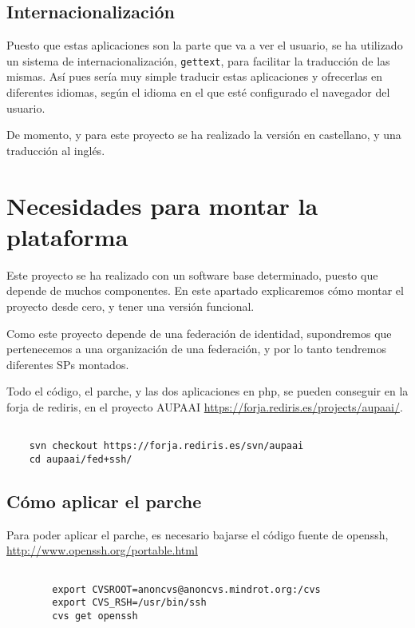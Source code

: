     \subsection{Internacionalización}

    Puesto que estas aplicaciones son la parte que va a ver el
    usuario, se ha utilizado un sistema de internacionalización,
    \texttt{gettext}, para facilitar la traducción de las mismas. Así
    pues sería muy simple traducir estas aplicaciones y ofrecerlas en
    diferentes idiomas, según el idioma en el que esté configurado el
    navegador del usuario.

    De momento, y para este proyecto se ha realizado la versión en
    castellano, y una traducción al inglés.

    \section{Necesidades para montar la plataforma}

    Este proyecto se ha realizado con un software base determinado,
    puesto que depende de muchos componentes. En este apartado
    explicaremos cómo montar el proyecto desde cero, y tener una
    versión funcional.

    Como este proyecto depende de una federación de identidad,
    supondremos que pertenecemos a una organización de una federación,
    y por lo tanto tendremos diferentes SPs montados.

    Todo el código, el parche, y las dos aplicaciones en php, se
    pueden conseguir en la forja de rediris, en el proyecto AUPAAI 
    \url{https://forja.rediris.es/projects/aupaai/}.

    \begin{verbatim}

    svn checkout https://forja.rediris.es/svn/aupaai   
    cd aupaai/fed+ssh/

    \end{verbatim}

        \subsection{Cómo aplicar el parche}

        Para poder aplicar el parche, es necesario bajarse el código
        fuente de openssh, \url{http://www.openssh.org/portable.html}

        \begin{verbatim}

        export CVSROOT=anoncvs@anoncvs.mindrot.org:/cvs
        export CVS_RSH=/usr/bin/ssh
        cvs get openssh

        \end{verbatim}

